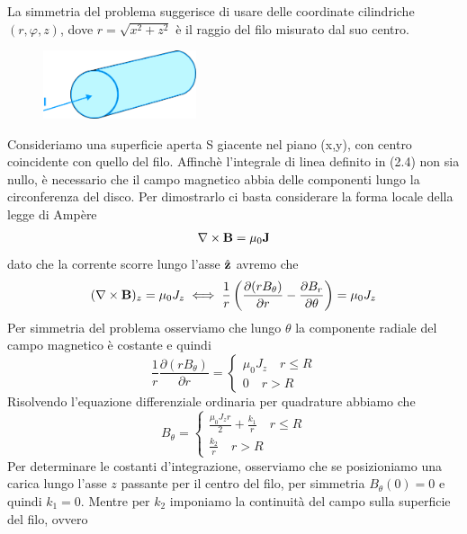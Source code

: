 La simmetria del problema suggerisce di usare delle coordinate cilindriche $(r,\varphi,z)$, dove $r = \sqrt{x^2 + z^2}$ \`e il raggio del filo misurato dal suo centro.
\begin{figure}  %
    \centering
    \includegraphics[width=0.4\textwidth]{images/cable}  %
\end{figure}
Consideriamo una superficie aperta S giacente nel piano (x,y), con centro coincidente con quello del filo. Affinch\`e  l'integrale di linea definito in (2.4) non sia nullo, \`e necessario che il campo magnetico abbia delle componenti lungo la circonferenza del disco. Per dimostrarlo ci basta considerare la forma locale della legge di Amp\`ere 
\begin{equation*}
\nabla \times \bold{B} = \mu_0 \bold{J} 
\end{equation*}
dato che la corrente scorre lungo l'asse $\hat{\bold{z}}$ avremo che 
\begin{equation*}
	(\nabla \times \bold{B})_z = \mu_0 J_z \iff  \frac{1}{r} \left(\frac{\partial (rB_{\theta})}{\partial r} - \frac{\partial B_r}{\partial \theta } \right) = \mu_0J_z
\end{equation*}
Per simmetria del problema osserviamo che lungo $\theta$ la componente radiale del campo magnetico \`e costante e quindi 
\begin{equation*}
	\frac{1}{r }\frac{\partial(r B_\theta)}{\partial r} = \left \{ \begin{array}{l}
	\mu_0J_z \quad r \leq R \\
	0 \quad r > R
	\end{array}\right.
\end{equation*}
Risolvendo l'equazione differenziale ordinaria per quadrature abbiamo che 
\begin{equation*}
	B_{\theta} = \left \{ \begin{array}{l}
		\frac{\mu_0 J_z r}{2} + \frac{k_1}{r} \quad r \leq R \\
		\frac{k_2}{r} \quad r > R
	\end{array}\right.
\end{equation*}
Per determinare le costanti d'integrazione, osserviamo che se posizioniamo una carica lungo l'asse $z$ passante per il centro del filo, per simmetria $B_\theta(0) = 0$ e quindi $k_1 =0$. Mentre per $k_2$ imponiamo la continuit\`a del campo sulla superficie del filo, ovvero
